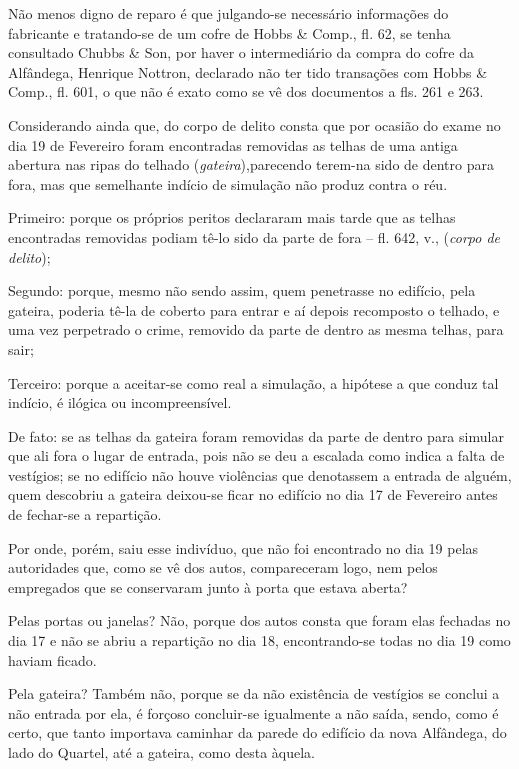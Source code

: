 Não menos digno de reparo é que julgando-se necessário informações do
fabricante e tratando-se de um cofre de Hobbs \& Comp., fl. 62, se tenha
consultado Chubbs \& Son, por haver o intermediário da compra do cofre
da Alfândega, Henrique Nottron, declarado não ter tido transações com
Hobbs \& Comp., fl. 601, o que não é exato como se vê dos documentos a
fls. 261 e 263.

Considerando ainda que, do corpo de delito consta que por ocasião do
exame no dia 19 de Fevereiro foram encontradas removidas as telhas de
uma antiga abertura nas ripas do telhado (\emph{gateira}),parecendo
terem-na sido de dentro para fora, mas que semelhante indício de
simulação não produz contra o réu.

Primeiro: porque os próprios peritos declararam mais tarde que as telhas
encontradas removidas podiam tê-lo sido da parte de fora -- fl. 642, v.,
(\emph{corpo de delito});

Segundo: porque, mesmo não sendo assim, quem penetrasse no edifício,
pela gateira, poderia tê-la de coberto para entrar e aí depois
recomposto o telhado, e uma vez perpetrado o crime, removido da parte de
dentro as mesma telhas, para sair;

Terceiro: porque a aceitar-se como real a simulação, a hipótese a que
conduz tal indício, é ilógica ou incompreensível.

De fato: se as telhas da gateira foram removidas da parte de dentro para
simular que ali fora o lugar de entrada, pois não se deu a escalada como
indica a falta de vestígios; se no edifício não houve violências que
denotassem a entrada de alguém, quem descobriu a gateira deixou-se ficar
no edifício no dia 17 de Fevereiro antes de fechar-se a repartição.

Por onde, porém, saiu esse indivíduo, que não foi encontrado no dia 19
pelas autoridades que, como se vê dos autos, compareceram logo, nem
pelos empregados que se conservaram junto à porta que estava aberta?

Pelas portas ou janelas? Não, porque dos autos consta que foram elas
fechadas no dia 17 e não se abriu a repartição no dia 18, encontrando-se
todas no dia 19 como haviam ficado.

Pela gateira? Também não, porque se da não existência de vestígios se
conclui a não entrada por ela, é forçoso concluir-se igualmente a não
saída, sendo, como é certo, que tanto importava caminhar da parede do
edifício da nova Alfândega, do lado do Quartel, até a gateira, como
desta àquela.

